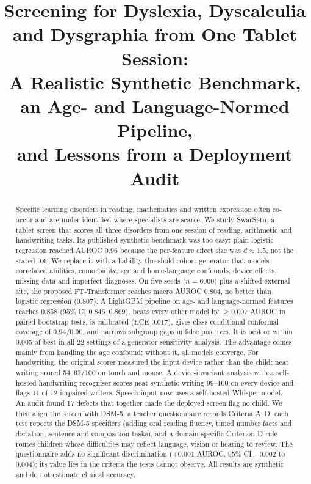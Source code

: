 \documentclass[conference]{IEEEtran}
\begin{document}
\title{Screening for Dyslexia, Dyscalculia and Dysgraphia from One Tablet Session:\\
A Realistic Synthetic Benchmark, an Age- and Language-Normed Pipeline,\\
and Lessons from a Deployment Audit}

\author{
}

\maketitle

\begin{abstract}
Specific learning disorders in reading, mathematics and written expression often
co-occur and are under-identified where specialists are scarce. We study SwarSetu, a
tablet screen that scores all three disorders from one session of reading, arithmetic
and handwriting tasks. Its published synthetic benchmark was too easy: plain logistic
regression reached AUROC 0.96 because the per-feature effect size was $d\approx1.5$,
not the stated 0.6. We replace it with a liability-threshold cohort generator that
models correlated abilities, comorbidity, age and home-language confounds, device
effects, missing data and imperfect diagnoses. On five seeds ($n{=}6000$) plus a
shifted external site, the proposed FT-Transformer reaches macro AUROC 0.804, no
better than logistic regression (0.807). A LightGBM pipeline on age- and
language-normed features reaches 0.858 (95\% CI 0.846--0.869), beats every other
model by $\geq$0.007 AUROC in paired bootstrap tests, is calibrated (ECE 0.017),
gives class-conditional conformal coverage of 0.94/0.90, and narrows subgroup gaps
in false positives. It is best or within 0.005 of best in all 22 settings of a
generator sensitivity analysis. The advantage comes mainly from handling the age
confound: without it, all models converge. For handwriting, the original scorer
measured the input device rather than the child: neat writing scored 54--62/100
on touch and mouse. A device-invariant analysis with a self-hosted handwriting
recogniser scores neat synthetic writing 99--100 on every device and flags 11 of
12 impaired writers. Speech input now uses a self-hosted Whisper model. An audit
found 17 defects that together made the deployed screen flag no child. We then align
the screen with DSM-5: a teacher questionnaire records Criteria A--D, each test reports
the DSM-5 specifiers (adding oral reading fluency, timed number facts and dictation,
sentence and composition tasks), and a domain-specific Criterion D rule routes
children whose difficulties may reflect language, vision or hearing to review. The
questionnaire adds no significant discrimination ($+0.001$ AUROC, 95\% CI $-0.002$ to
$0.004$); its value lies in the criteria the tests cannot observe. All results are
synthetic and do not estimate clinical accuracy.
\end{abstract}
\end{document}
